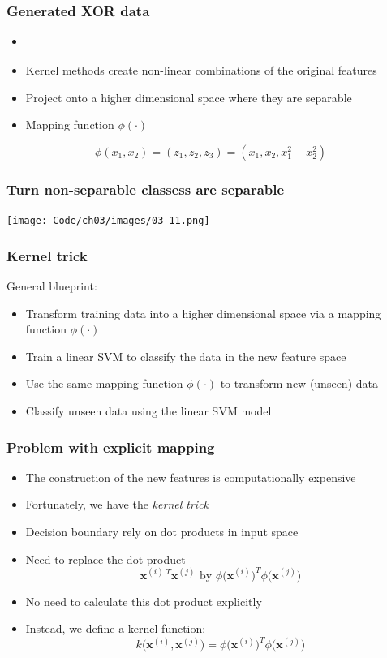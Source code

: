 \documentclass{beamer}
\begin{document}
\begin{frame}
  \frametitle{Generated XOR data}
  \begin{itemize}
  \item \href{https://github.com/rasbt/python-machine-learning-book/blob/master/code/ch03/ch03.ipynb}{}
  \item Kernel methods create non-linear combinations of the original features
  \item Project onto a higher dimensional space where they are separable
  \item Mapping function $\phi(\cdot)$
  \end{itemize}
  \[
  \phi(x_1, x_2) = (z_1, z_2, z_3) = (x_1, x_2, x_{1}^{2} + x_{2}^{2})
  \]
\end{frame}

\begin{frame}
  \frametitle{Turn non-separable classess are separable}
  \texttt{[image: Code/ch03/images/03\_11.png]}
\end{frame}

\begin{frame}
  \frametitle{Kernel trick}
  General blueprint:
  \begin{itemize}
  \item Transform training data into a higher dimensional space via a mapping function $\phi(\cdot)$
  \item Train a linear SVM to classify the data in the new feature space
  \item Use the same mapping function $\phi(\cdot)$ to transform new (unseen) data
  \item Classify unseen data using the linear SVM model
  \end{itemize}
\end{frame}

\begin{frame}
  \frametitle{Problem with explicit mapping}
  \begin{itemize}
  \item The construction of the new features is computationally expensive
  \item Fortunately, we have the \textit{kernel trick}
  \item Decision boundary rely on dot products in input space
  \item Need to replace the dot product
    \[
    \mathbf{x}^{(i) \; T} \mathbf{x}^{(j)} \text{ by } \phi \big( \mathbf{x}^{(i)} \big)^T \phi \big( \mathbf{x}^{(j)} \big)
    \]
  \item No need to calculate this dot product explicitly
  \item Instead, we define a kernel function:
    \[
    k \big( \mathbf{x}^{(i)}, \mathbf{x}^{(j)}  \big) = \phi \big( \mathbf{x}^{(i)} \big)^T \phi \big( \mathbf{x}^{(j)} \big)
    \]
  \end{itemize}
\end{frame}
\end{document}
